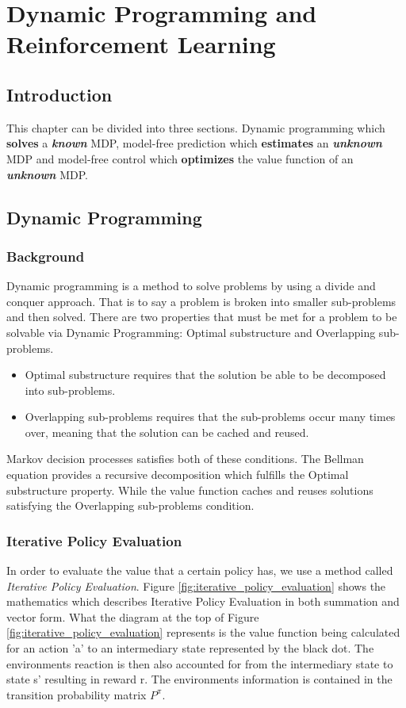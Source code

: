\graphicspath{{RL/fig}}
\chapter{Dynamic Programming and Reinforcement Learning}
\label{chap:RL}

\section{Introduction}
This chapter can be divided into three sections. Dynamic programming which \textbf{solves} a \textit{\textbf{known}} MDP, model-free prediction which \textbf{estimates} an \textit{\textbf{unknown}} MDP and model-free control which \textbf{optimizes} the value function of an \textit{\textbf{unknown}} MDP.

\section{Dynamic Programming}
\subsection{Background}
Dynamic programming is a method to solve problems by using a divide and conquer approach. That is to say a problem is broken into smaller sub-problems and then solved.
There are two properties that must be met for a problem to be solvable via Dynamic Programming: Optimal substructure and Overlapping sub-problems. \cite{David_Silver}
\begin{itemize}
	\item Optimal substructure requires that the solution be able to be decomposed into sub-problems.
	\item Overlapping sub-problems requires that the sub-problems occur many times over, meaning that the solution can be cached and reused.
\end{itemize}

Markov decision processes satisfies both of these conditions. The Bellman equation provides a recursive decomposition which fulfills the Optimal substructure property. While the value function caches and reuses solutions satisfying the Overlapping sub-problems condition. \cite{David_Silver}\\

\subsection{Iterative Policy Evaluation}
In order to evaluate the value that a certain policy has, we use a method called \textit{Iterative Policy Evaluation}. Figure \ref{fig:iterative_policy_evaluation} shows the mathematics which describes Iterative Policy Evaluation in both summation and vector form. What the diagram  at the top of Figure \ref{fig:iterative_policy_evaluation} represents is the value function being calculated for an action 'a' to an intermediary state represented by the black dot. The environments reaction is then also accounted for from the intermediary state to state s' resulting in reward r. The environments information is contained in the transition probability matrix $P^\pi$.

